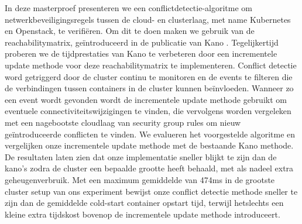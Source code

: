 In deze masterproef presenteren we een conflictdetectie-algoritme om netwerkbeveiligingsregels tussen de cloud- en clusterlaag, met name Kubernetes en Openstack, te verifiëren. Om dit te doen maken we gebruik van de reachabilitymatrix, geïntroduceerd in de publicatie van Kano \cite{kano}. Tegelijkertijd proberen we de tijdprestaties van Kano te verbeteren door een incrementele update methode voor deze reachabilitymatrix te implementeren. Conflict detectie word getriggerd door de cluster continu te monitoren en de events te filteren die de verbindingen tussen containers in de cluster kunnen beïnvloeden. Wanneer zo een event wordt gevonden wordt de incrementele update methode gebruikt om eventuele connectiviteitswijzigingen te vinden, die vervolgens worden vergeleken met een nagebootste cloudlaag van security group rules om nieuw geïntroduceerde conflicten te vinden. We evalueren het voorgestelde algoritme en vergelijken onze incrementele update methode met de bestaande Kano methode. De resultaten laten zien dat onze implementatie sneller blijkt te zijn dan de kano's zodra de cluster een bepaalde grootte heeft behaald, met als nadeel extra geheugenverbruik. Met een maximum gemiddelde van 474ms in de grootste cluster setup van ons experiment bewijst onze conflict detectie methode sneller te zijn dan de gemiddelde cold-start container opstart tijd, terwijl hetslechts een kleine extra tijdskost bovenop de incrementele update methode introduceert.
